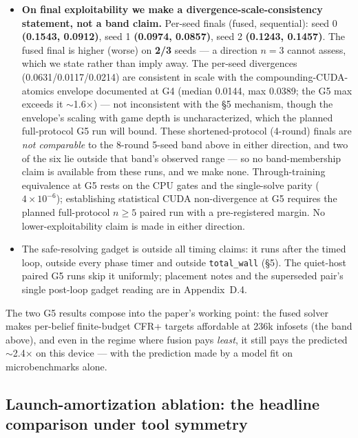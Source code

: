 \documentclass[11pt]{article}
\begin{document}
\begin{itemize}
\item \textbf{On final exploitability we make a divergence-scale-consistency statement,
not a band claim.} Per-seed finals (fused, sequential): seed 0 \textbf{(0.1543,
0.0912)}, seed 1 \textbf{(0.0974, 0.0857)}, seed 2 \textbf{(0.1243, 0.1457)}. The fused
final is higher (worse) on \textbf{2/3} seeds --- a direction $n{=}3$ cannot assess,
which we state rather than imply away. The per-seed divergences (0.0631/0.0117/0.0214)
are consistent in scale with the compounding-CUDA-atomics envelope documented at G4
(median 0.0144, max 0.0389; the G5 max exceeds it $\sim$1.6$\times$) --- not
inconsistent with the \S5 mechanism, though the envelope's scaling with game depth is
uncharacterized, which the planned full-protocol G5 run will bound. These
shortened-protocol (4-round) finals are \emph{not comparable} to the 8-round 5-seed band
above in either direction, and two of the six lie outside that band's observed range ---
so no band-membership claim is available from these runs, and we make none.
Through-training equivalence at G5 rests on the CPU gates and the single-solve parity
($4\times10^{-6}$); establishing statistical CUDA non-divergence at G5 requires the planned
full-protocol $n \ge 5$ paired run with a pre-registered margin. No lower-exploitability
claim is made in either direction.
\item The safe-resolving gadget is outside all timing claims: it runs after the timed
loop, outside every phase timer and outside \texttt{total\_wall} (\S5). The quiet-host
paired G5 runs skip it uniformly; placement notes and the superseded pair's single
post-loop gadget reading are in Appendix~D.4.
\end{itemize}

The two G5 results compose into the paper's working point: the fused solver makes
per-belief finite-budget CFR+ targets affordable at 236k infosets (the band above), and even in
the regime where fusion pays \emph{least}, it still pays the predicted $\sim$2.4$\times$
on this device --- with the prediction made by a model fit on microbenchmarks alone.

\subsection{Launch-amortization ablation: the headline comparison under tool symmetry}
\end{document}
